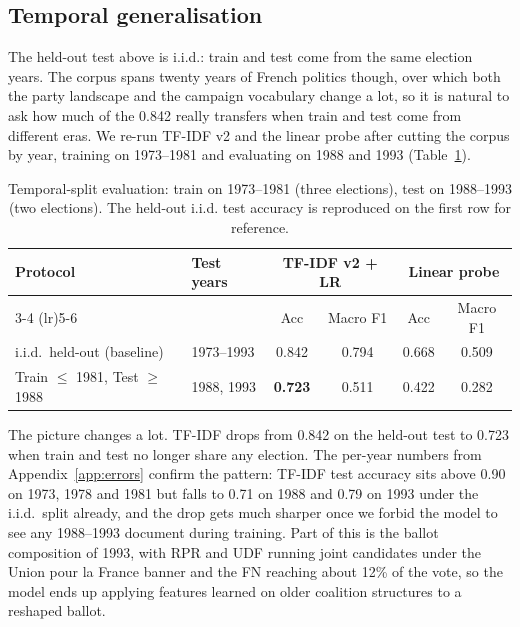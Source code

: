 \documentclass{article}
\begin{document}
\subsection{Temporal generalisation}
\label{sec:temporal}

The held-out test above is i.i.d.: train and test come from the same election years. The corpus spans twenty years of French politics though, over which both the party landscape and the campaign vocabulary change a lot, so it is natural to ask how much of the 0.842 really transfers when train and test come from different eras. We re-run TF-IDF v2 and the linear probe after cutting the corpus by year, training on 1973--1981 and evaluating on 1988 and 1993 (Table~\ref{tab:temporal}).

\begin{table}[h]
  \caption{Temporal-split evaluation: train on 1973--1981 (three elections), test on 1988--1993 (two elections). The held-out i.i.d. test accuracy is reproduced on the first row for reference.}
  \label{tab:temporal}
  \centering
  \small
  \begin{tabular}{llcccc}
    \toprule
    \multirow{2}{*}{Protocol} & \multirow{2}{*}{Test years} &
      \multicolumn{2}{c}{TF-IDF v2 + LR} & \multicolumn{2}{c}{Linear probe} \\
    \cmidrule(lr){3-4} \cmidrule(lr){5-6}
    & & Acc & Macro F1 & Acc & Macro F1 \\
    \midrule
    i.i.d.\ held-out (baseline)             & 1973--1993 & 0.842 & 0.794 & 0.668 & 0.509 \\
    Train $\leq$ 1981, Test $\geq$ 1988     & 1988, 1993 & \textbf{0.723} & 0.511 & 0.422 & 0.282 \\
    \bottomrule
  \end{tabular}
\end{table}

The picture changes a lot. TF-IDF drops from 0.842 on the held-out test to 0.723 when train and test no longer share any election. The per-year numbers from Appendix~\ref{app:errors} confirm the pattern: TF-IDF test accuracy sits above 0.90 on 1973, 1978 and 1981 but falls to 0.71 on 1988 and 0.79 on 1993 under the i.i.d.\ split already, and the drop gets much sharper once we forbid the model to see any 1988--1993 document during training. Part of this is the ballot composition of 1993, with RPR and UDF running joint candidates under the Union pour la France banner and the FN reaching about 12\% of the vote, so the model ends up applying features learned on older coalition structures to a reshaped ballot.
\end{document}
